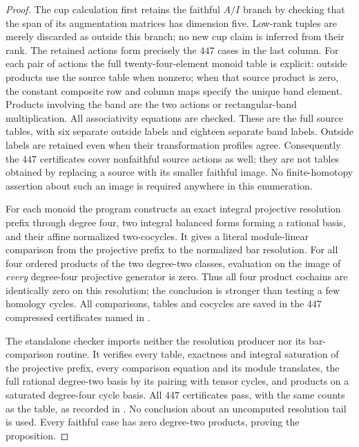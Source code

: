 \begin{proof}
The cup calculation  first
retains the faithful $A/I$ branch by checking that the span of
its augmentation matrices has dimension five.  Low-rank tuples
are merely discarded as outside this branch; no new cup claim
is inferred from their rank.  The retained actions form precisely
the $447$ cases in the last column.  For each pair of actions the
full twenty-four-element monoid table is explicit: outside
products use the source table when nonzero; when that source
product is zero, the constant composite row and column maps
specify the unique band element.  Products involving the band
are the two actions or rectangular-band multiplication.  All
associativity equations are checked.
These are the full source tables, with six separate outside
labels and eighteen separate band labels.  Outside labels are
retained even when their transformation profiles agree.
Consequently the $447$ certificates cover nonfaithful source
actions as well; they are not tables obtained by replacing a
source with its smaller faithful image.  No finite-homotopy
assertion about such an image is required anywhere in this
enumeration.

For each monoid the program constructs an exact integral
projective resolution prefix through degree four, two integral
balanced forms forming a rational basis, and their affine normalized
two-cocycles.  It gives a literal module-linear comparison from
the projective prefix to the normalized bar resolution.  For all
four ordered products of the two degree-two classes, evaluation
on the image of \emph{every} degree-four projective generator is
zero.  Thus all four product cochains are identically zero on
this resolution; the conclusion is stronger than testing a few
homology cycles.  All comparisons, tables and cocycles are saved
in the $447$ compressed certificates named in
.

The standalone checker 
imports neither the resolution producer nor its bar-comparison
routine.  It verifies every table, exactness and integral
saturation of the projective prefix, every comparison equation
and its module translates, the full rational degree-two basis
by its pairing with tensor cycles, and products on a saturated
degree-four cycle basis.  All $447$ certificates pass, with the
same counts as the table, as recorded in
.
No conclusion about an uncomputed resolution tail is used.
Every faithful case has zero degree-two products, proving the
proposition.
\end{proof}

